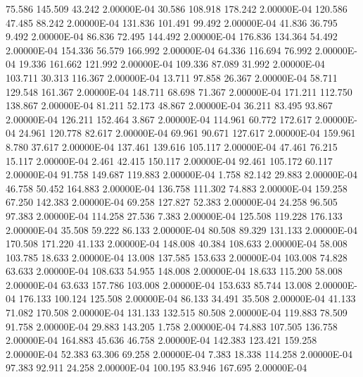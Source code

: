     75.586   145.509    43.242  2.00000E-04
    30.586   108.918   178.242  2.00000E-04
   120.586    47.485    88.242  2.00000E-04
   131.836   101.491    99.492  2.00000E-04
    41.836    36.795     9.492  2.00000E-04
    86.836    72.495   144.492  2.00000E-04
   176.836   134.364    54.492  2.00000E-04
   154.336    56.579   166.992  2.00000E-04
    64.336   116.694    76.992  2.00000E-04
    19.336   161.662   121.992  2.00000E-04
   109.336    87.089    31.992  2.00000E-04
   103.711    30.313   116.367  2.00000E-04
    13.711    97.858    26.367  2.00000E-04
    58.711   129.548   161.367  2.00000E-04
   148.711    68.698    71.367  2.00000E-04
   171.211   112.750   138.867  2.00000E-04
    81.211    52.173    48.867  2.00000E-04
    36.211    83.495    93.867  2.00000E-04
   126.211   152.464     3.867  2.00000E-04
   114.961    60.772   172.617  2.00000E-04
    24.961   120.778    82.617  2.00000E-04
    69.961    90.671   127.617  2.00000E-04
   159.961     8.780    37.617  2.00000E-04
   137.461   139.616   105.117  2.00000E-04
    47.461    76.215    15.117  2.00000E-04
     2.461    42.415   150.117  2.00000E-04
    92.461   105.172    60.117  2.00000E-04
    91.758   149.687   119.883  2.00000E-04
     1.758    82.142    29.883  2.00000E-04
    46.758    50.452   164.883  2.00000E-04
   136.758   111.302    74.883  2.00000E-04
   159.258    67.250   142.383  2.00000E-04
    69.258   127.827    52.383  2.00000E-04
    24.258    96.505    97.383  2.00000E-04
   114.258    27.536     7.383  2.00000E-04
   125.508   119.228   176.133  2.00000E-04
    35.508    59.222    86.133  2.00000E-04
    80.508    89.329   131.133  2.00000E-04
   170.508   171.220    41.133  2.00000E-04
   148.008    40.384   108.633  2.00000E-04
    58.008   103.785    18.633  2.00000E-04
    13.008   137.585   153.633  2.00000E-04
   103.008    74.828    63.633  2.00000E-04
   108.633    54.955   148.008  2.00000E-04
    18.633   115.200    58.008  2.00000E-04
    63.633   157.786   103.008  2.00000E-04
   153.633    85.744    13.008  2.00000E-04
   176.133   100.124   125.508  2.00000E-04
    86.133    34.491    35.508  2.00000E-04
    41.133    71.082   170.508  2.00000E-04
   131.133   132.515    80.508  2.00000E-04
   119.883    78.509    91.758  2.00000E-04
    29.883   143.205     1.758  2.00000E-04
    74.883   107.505   136.758  2.00000E-04
   164.883    45.636    46.758  2.00000E-04
   142.383   123.421   159.258  2.00000E-04
    52.383    63.306    69.258  2.00000E-04
     7.383    18.338   114.258  2.00000E-04
    97.383    92.911    24.258  2.00000E-04
   100.195    83.946   167.695  2.00000E-04

